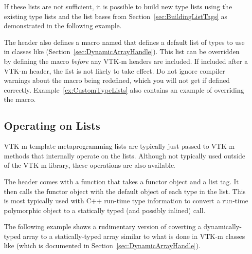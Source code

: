 If these lists are not sufficient, it is possible to build new type lists
using the existing type lists and the list bases from
Section~\ref{sec:BuildingListTags} as demonstrated in the following
example.


The  header also defines a macro named
 that defines a default list of
types to use in classes like 
(Section~\ref{sec:DynamicArrayHandle}). This list can be overridden by
defining the  macro \emph{before}
any VTK-m headers are included. If included after a VTK-m header, the list
is not likely to take effect. Do not ignore compiler warnings about the
macro being redefined, which you will not get if defined
correctly. Example~\ref{ex:CustomTypeLists} also contains an example of
overriding the  macro.


\subsection{Operating on Lists}
\label{sec:OperatingOnLists}

VTK-m template metaprogramming lists are typically just passed to VTK-m
methods that internally operate on the lists. Although not typically used
outside of the VTK-m library, these operations are also available.

The  header comes with a 
function that takes a functor object and a list tag. It then calls the
functor object with the default object of each type in the list. This is
most typically used with C++ run-time type information to convert a
run-time polymorphic object to a statically typed (and possibly inlined)
call.

The following example shows a rudimentary version of coverting a
dynamically-typed array to a statically-typed array similar to what is done
in VTK-m classes like  (which is documented in
Section~\ref{sec:DynamicArrayHandle}).



